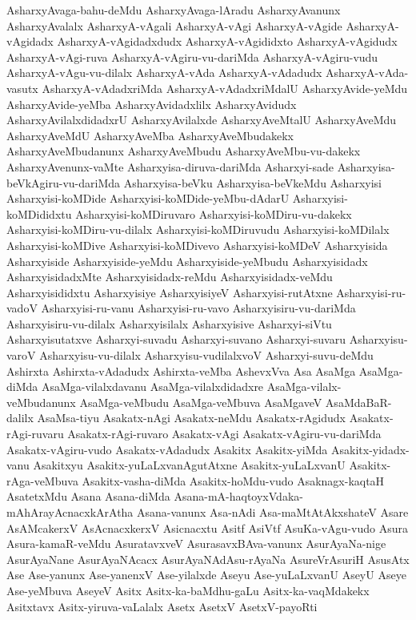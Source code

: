 {AsharxyAvaga-bahu-deMdu
AsharxyAvaga-lAradu
AsharxyAvanunx
AsharxyAvalalx
AsharxyA-vAgali
AsharxyA-vAgi
AsharxyA-vAgide
AsharxyA-vAgidadx
AsharxyA-vAgidadxdudx
AsharxyA-vAgididxto
AsharxyA-vAgidudx
AsharxyA-vAgi-ruva
AsharxyA-vAgiru-vu-dariMda
AsharxyA-vAgiru-vudu
AsharxyA-vAgu-vu-dilalx
AsharxyA-vAda
AsharxyA-vAdadudx
AsharxyA-vAda-vasutx
AsharxyA-vAdadxriMda
AsharxyA-vAdadxriMdalU
AsharxyAvide-yeMdu
AsharxyAvide-yeMba
AsharxyAvidadxlilx
AsharxyAvidudx
AsharxyAvilalxdidadxrU
AsharxyAvilalxde
AsharxyAveMtalU
AsharxyAveMdu
AsharxyAveMdU
AsharxyAveMba
AsharxyAveMbudakekx
AsharxyAveMbudanunx
AsharxyAveMbudu
AsharxyAveMbu-vu-dakekx
AsharxyAvenunx-vaMte
Asharxyisa-diruva-dariMda
Asharxyi-sade
Asharxyisa-beVkAgiru-vu-dariMda
Asharxyisa-beVku
Asharxyisa-beVkeMdu
Asharxyisi
Asharxyisi-koMDide
Asharxyisi-koMDide-yeMbu-dAdarU
Asharxyisi-koMDididxtu
Asharxyisi-koMDiruvaro
Asharxyisi-koMDiru-vu-dakekx
Asharxyisi-koMDiru-vu-dilalx
Asharxyisi-koMDiruvudu
Asharxyisi-koMDilalx
Asharxyisi-koMDive
Asharxyisi-koMDivevo
Asharxyisi-koMDeV
Asharxyisida
Asharxyiside
Asharxyiside-yeMdu
Asharxyiside-yeMbudu
Asharxyisidadx
AsharxyisidadxMte
Asharxyisidadx-reMdu
Asharxyisidadx-veMdu
Asharxyisididxtu
Asharxyisiye
AsharxyisiyeV
Asharxyisi-rutAtxne
Asharxyisi-ru-vadoV
Asharxyisi-ru-vanu
Asharxyisi-ru-vavo
Asharxyisiru-vu-dariMda
Asharxyisiru-vu-dilalx
Asharxyisilalx
Asharxyisive
Asharxyi-siVtu
Asharxyisutatxve
Asharxyi-suvadu
Asharxyi-suvano
Asharxyi-suvaru
Asharxyisu-varoV
Asharxyisu-vu-dilalx
Asharxyisu-vudilalxvoV
Asharxyi-suvu-deMdu
Ashirxta
Ashirxta-vAdadudx
Ashirxta-veMba
AshevxVva
Asa
AsaMga
AsaMga-diMda
AsaMga-vilalxdavanu
AsaMga-vilalxdidadxre
AsaMga-vilalx-veMbudanunx
AsaMga-veMbudu
AsaMga-veMbuva
AsaMgaveV
AsaMdaBaR-dalilx
AsaMsa-tiyu
Asakatx-nAgi
Asakatx-neMdu
Asakatx-rAgidudx
Asakatx-rAgi-ruvaru
Asakatx-rAgi-ruvaro
Asakatx-vAgi
Asakatx-vAgiru-vu-dariMda
Asakatx-vAgiru-vudo
Asakatx-vAdadudx
Asakitx
Asakitx-yiMda
Asakitx-yidadx-vanu
Asakitxyu
Asakitx-yuLaLxvanAgutAtxne
Asakitx-yuLaLxvanU
Asakitx-rAga-veMbuva
Asakitx-vasha-diMda
Asakitx-hoMdu-vudo
Asaknagx-kaqtaH
AsatetxMdu
Asana
Asana-diMda
Asana-mA-haqtoyxVdaka-mAhArayAcnacxkArAtha
Asana-vanunx
Asa-nAdi
Asa-maMtAtAkxshateV
Asare
AsAMcakerxV
AsAcnacxkerxV
Asicnacxtu
Asitf
AsiVtf
AsuKa-vAgu-vudo
Asura
Asura-kamaR-veMdu
AsuratavxveV
AsurasavxBAva-vanunx
AsurAyaNa-nige
AsurAyaNane
AsurAyaNAcacx
AsurAyaNAdAsu-rAyaNa
AsureVrAsuriH
AsusAtx
Ase
Ase-yanunx
Ase-yanenxV
Ase-yilalxde
Aseyu
Ase-yuLaLxvanU
AseyU
Aseye
Ase-yeMbuva
AseyeV
Asitx
Asitx-ka-baMdhu-gaLu
Asitx-ka-vaqMdakekx
Asitxtavx
Asitx-yiruva-vaLalalx
Asetx
AsetxV
AsetxV-payoRti
}
